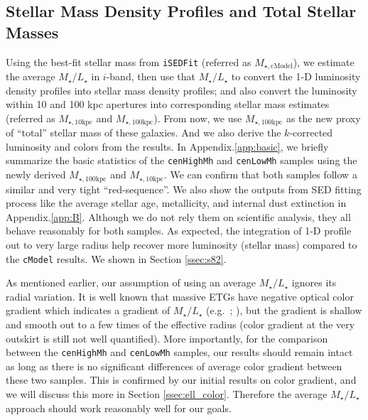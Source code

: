\documentclass{emulateapj}
\def\cmodel{\texttt{cModel}}
\def\rbcg{\texttt{cenHighMh}}
\def\nbcg{\texttt{cenLowMh}}
\def\minn{{$M_{\star,10\mathrm{kpc}}$}}
\def\mtot{{$M_{\star,100\mathrm{kpc}}$}}
\def\mcmodel{{$M_{\star,\mathrm{cModel}}$}}
\def\m2l{{$M_{\star}/L_{\star}$}}
\begin{document}
\begin{CJK*}{UTF8}{gbsn}
\subsection{Stellar Mass Density Profiles and Total Stellar Masses}
    \label{ssec:mtotal}
        
    Using the best-fit stellar mass from \texttt{iSEDFit} (referred as \mcmodel{}), 
    we estimate the average \m2l{} in $i$-band, then use that \m2l{} to convert the 
    1-D luminosity density profiles into stellar mass density profiles; and 
    also convert the luminosity within 10 and 100 kpc apertures into 
    corresponding stellar mass estimates (referred as \minn{} and \mtot{}). 
    From now, we use \mtot{} as the new proxy of ``total'' stellar mass of these 
    galaxies.  
    And we also derive the $k$-corrected luminosity and colors from the results.
    In Appendix.\ref{app:basic}, we briefly summarize the basic statistics of 
    the \rbcg{} and \nbcg{} samples using the newly derived \mtot{} and \minn{}.
    We can confirm that both samples follow a similar and very tight ``red-sequence''.
    We also show the outputs from SED fitting process like the average stellar age, 
    metallicity, and internal dust extinction in Appendix.\ref{app:B}.
    Although we do not rely them on scientific analysis, they all behave reasonably for 
    both samples. 
    As expected, the integration of 1-D profile out to very large radius help 
    recover more luminosity (stellar mass) compared to the \cmodel{} results. 
    We shown in Section \ref{ssec:s82}.
    
    As mentioned earlier, our assumption of using an average \m2l{} ignores its
    radial variation.   
    It is well known that massive ETGs have negative optical color gradient which 
    indicates a gradient of \m2l{} (e.g.\ \citealt{LaBarbera2012}; 
    \citealt{DSouza2015}), but the gradient is shallow and smooth out to a few 
    times of the effective radius (color gradient at the very outskirt is still 
    not well quantified). 
    More importantly, for the comparison between the \rbcg{} and \nbcg{} samples, 
    our results should remain intact as long as there is no significant
    differences of average color gradient between these two samples.
    This is confirmed by our initial results on color gradient, and we will 
    discuss this more in Section \ref{ssec:ell_color}.
    Therefore the average \m2l{} approach should work reasonably well for our goals.
    

\end{CJK*}
\end{document}
